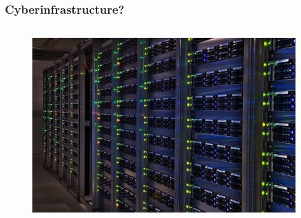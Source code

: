 \begin{frame}
\frametitle{Cyberinfrastructure?}

\begin{columns}[T] %

\begin{column}{.70\textwidth}
\begin{figure}[htbp]
\begin{center}
\includegraphics[width=0.9\textwidth]{images/1008289_02-A5-at-72-dpi.jpg}
\end{center}
\end{figure}
\end{column}%


\end{columns}
\end{frame}
